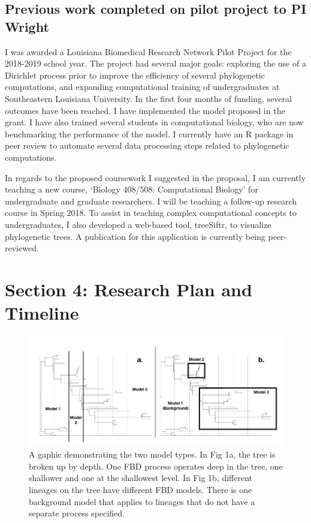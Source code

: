 \documentclass[]{article}
\begin{document}
\subsection*{Previous work completed on pilot project to PI Wright}

I was awarded a Louisiana Biomedical Research Network Pilot Project for the 2018-2019 school year.
The project had several major goals: exploring the use of a Dirichlet process prior to improve the efficiency of several phylogenetic computations, and expanding computational training of undergraduates at Southeastern Louisiana University.
In the first four months of funding, several outcomes have been reached.
I have implemented the model proposed in the grant.
I have also trained several students in computational biology, who are now benchmarking the performance of the model.
I currently have an R package in peer review to automate several data processing steps related to phylogenetic computations. \par
In regards to the proposed coursework I suggested in the proposal, I am currently teaching a new course, `Biology 408/508: Computational Biology' for undergraduate and graduate researchers.
I will be teaching a follow-up research course in Spring 2018.
To assist in teaching complex computational concepts to undergraduates, I also developed a web-based tool, treeSiftr, to visualize phylogenetic trees.
A publication for this application is currently being peer-reviewed. \par

\pagebreak
 
\section*{Section 4: Research Plan and Timeline}
\begin{figure}
    \includegraphics[width=1\textwidth]{2ab}
      \caption{A gaphic demonstrating the two model types. In Fig 1a, the tree is broken up by depth. One FBD process operates deep in the tree, one shallower and one at the shallowest level. In Fig 1b, different lineages on the tree have different FBD models. There is one background model that applies to lineages that do not have a separate process specified.}
  \centering
\end{figure}
\end{document}

